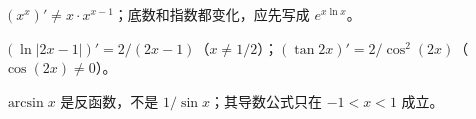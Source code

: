 \begin{trapbox}
\begin{minipage}{\linewidth}
\begin{description}[style=nextline,leftmargin=2.8em,labelsep=.5em]
\item[\textbf{\textcolor{CTrap}{易错点八（变指数误套幂公式）}}] $(x^x)'\ne x\cdot x^{x-1}$；底数和指数都变化，应先写成 $e^{x\ln x}$。
\end{description}

\end{minipage}
\end{trapbox}

\begin{trapbox}
\begin{minipage}{\linewidth}
\begin{description}[style=nextline,leftmargin=2.8em,labelsep=.5em]
\item[\textbf{\textcolor{CTrap}{易错点九（复合函数漏乘内层导数）}}] $(\ln|2x-1|)'=2/(2x-1)$（$x\ne1/2$）；$(\tan 2x)'=2/\cos^2(2x)$（$\cos(2x)\ne0$）。
\end{description}


\end{minipage}
\end{trapbox}

\begin{trapbox}
\begin{minipage}{\linewidth}
\begin{description}[style=nextline,leftmargin=2.8em,labelsep=.5em]
\item[\textbf{\textcolor{CTrap}{易错点十（反三角与倒数混淆）}}] $\arcsin x$ 是反函数，不是 $1/\sin x$；其导数公式只在 $-1<x<1$ 成立。
\end{description}

\end{minipage}
\end{trapbox}

